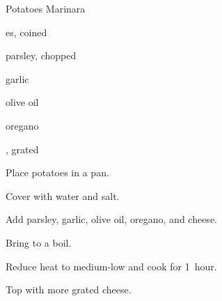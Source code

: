 \begin{recipe}{Potatoes Marinara}{}{}

\begin{ingredients}
\item {}es, coined
\item parsley, chopped
\item garlic
\item {} olive oil
\item oregano
\item {}, grated
\end{ingredients}

\begin{directions}
\item Place potatoes in a pan.
\item Cover with water and salt.
\item Add parsley, garlic, olive oil, oregano, and cheese.
\item Bring to a boil.
\item Reduce heat to medium-low and cook for 1~hour.
\item Top with more grated cheese.
\end{directions}

\end{recipe}
